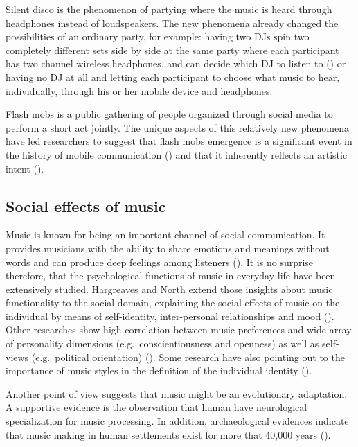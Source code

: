 \documentclass[a4paper,11pt]{article}
\begin{document}
Silent disco is the phenomenon of partying where the music is heard through headphones instead of loudspeakers.
The new phenomena already changed the possibilities of an ordinary party, for example: having two DJs spin two completely different sets side by side at the same party where each participant has two channel wireless headphones, and can decide which DJ to listen to (\citeauthor{web:headphonedisco}) or having no DJ at all and letting each participant to choose what music to hear, individually, through his or her mobile device and headphones.

Flash mobs is a public gathering of people organized through social media to perform a short act jointly.
The unique aspects of this relatively new phenomena have led researchers to suggest that flash mobs emergence is a significant event in the history of mobile communication (\cite{nicholson05}) and that it inherently reflects an artistic intent (\cite{brejzek10}).

\subsection{Social effects of music}

Music is known for being an important channel of social communication.
It provides musicians with the ability to share emotions and meanings without words and can produce deep feelings among listeners (\cite{hargreaves02}).
It is no surprise therefore, that the psychological functions of music in everyday life have been extensively studied.
Hargreaves and North extend those insights about music functionality to the social domain, explaining the social effects of music on the individual by means of self-identity, inter-personal relationships and mood (\cite{hargreaves99}).
Other researches show high correlation between music preferences and wide array of personality dimensions (e.g.\ conscientiousness and openness) as well as self-views (e.g.\ political orientation) (\cite{rentfrow03}).
Some research have also pointing out to the importance of music styles in the definition of the individual identity (\cite{cook00}).

Another point of view suggests that music might be an evolutionary adaptation.
A supportive evidence is the observation that human have neurological specialization for music processing.
In addition, archaeological evidences indicate that music making in human settlements exist for more that 40,000 years (\cite{Huron2001}).
\end{document}
